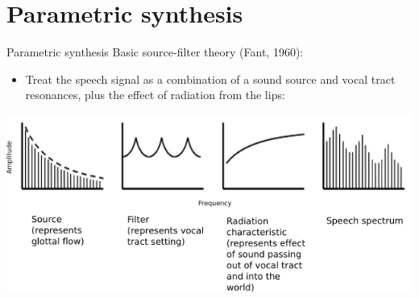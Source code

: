 \documentclass{beamer}
\begin{document}
\section{Parametric synthesis}
\begin{frame}{Parametric synthesis}
Basic source-filter theory (Fant, 1960):
\begin{itemize}
\item{Treat the speech signal as a combination of a sound source and vocal tract resonances, plus the effect of radiation from the lips:}
\end{itemize}
\hspace{-0.5cm}
\includegraphics[scale=0.6,keepaspectratio]{fant.png}
\end{frame}
\end{document}
